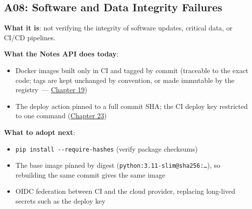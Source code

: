 \subsection*{A08: Software and Data Integrity Failures}\label{38-security:a08-software-and-data-integrity-failures}

\textbf{What it is}: not verifying the integrity of software updates, critical data, or CI/CD pipelines.

\textbf{What the Notes API does today}:

\begin{itemize}
\tightlist
\item
  Docker images built only in CI and tagged by commit (traceable to the exact code; tags are kept unchanged by convention, or made immutable by the registry~--- \hyperref[ch:19-artifact-storage]{Chapter 19})
\item
  The deploy action pinned to a full commit SHA; the CI deploy key restricted to one command (\hyperref[ch:23-code-transfer]{Chapter 23})
\end{itemize}

\noindent{}\textbf{What to adopt next}:

\begin{itemize}
\tightlist
\item
  \texttt{pip\ install\ -}\allowbreak{}\texttt{-}\allowbreak{}\texttt{require-}\allowbreak{}\texttt{hashes} (verify package checksums)
\item
  The base image pinned by digest (\texttt{python:}\allowbreak{}\texttt{3.}\allowbreak{}\texttt{11-}\allowbreak{}\texttt{slim@sha256:}\allowbreak{}\texttt{…}), so rebuilding the same commit gives the same image
\item
  OIDC federation between CI and the cloud provider, replacing long-lived secrets such as the deploy key
\end{itemize}

\begin{codebox}[short]

\begin{Shaded}
\begin{Highlighting}[]
 

\OperatorTok{=}\DataTypeTok{\textbackslash{}}
     \DataTypeTok{\textbackslash{}}
    \OperatorTok{=}
\end{Highlighting}
\end{Shaded}

\end{codebox}

